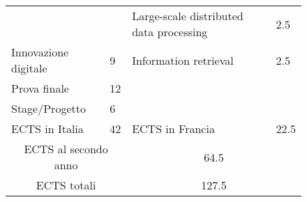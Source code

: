 \documentclass{article}
\begin{document}
\begin{figure}
\begin{adjustwidth}{-0.75cm}{}
\begin{tabular}{|m{5cm}|m{1cm}|m{5cm}|m{1cm}| }
          \cellcolor{gray!25} & \cellcolor{gray!25} & Large-scale distributed data processing & \cellcolor{blue!25}2.5 \\\cline{3-4}
          \multirow{-4}{*}{\cellcolor{gray!25}Innovazione digitale}
                     & \multirow{-4}{*}{\cellcolor{gray!25}9} & Information retrieval & \cellcolor{blue!25}2.5 \\
            
            
            \hline
            
            Prova finale & \cellcolor{red!25}12 & \multicolumn{2}{c|}{ } \\
            Stage/Progetto & \cellcolor{red!25}6 & \multicolumn{2}{c|}{ } \\
            \hline
            
            ECTS in Italia & \cellcolor{red!45}42 & ECTS in Francia & \cellcolor{blue!45}22.5 \\
            \hline
            
            \multicolumn{2}{|c}{ ECTS al secondo anno} & \multicolumn{2}{c|}{64.5} \\
            \hline
            
            \multicolumn{2}{|c}{ECTS totali} & \multicolumn{2}{c|}{127.5} \\
            \hline
            
        \end{tabular}
    \end{adjustwidth}
\end{figure}
\end{document}
